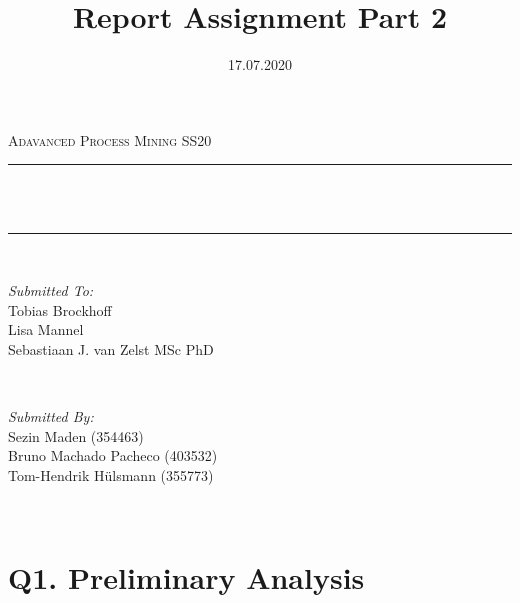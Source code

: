 \documentclass[12pt]{report}
\title{Report Assignment Part 2}
\author{}
\date{17.07.2020}
\makeatletter
\let\thetitle\@title
\makeatother
\begin{document}

\begin{titlepage}
	\centering
    \vspace*{0.5 cm}
  \begin{center}    \textsc{\Large   Adavanced Process Mining SS20}\\[2.0 cm]	\end{center}
	\rule{\linewidth}{0.2 mm} \\[0.4 cm]
	{ \huge \bfseries \thetitle}\\
	\rule{\linewidth}{0.2 mm} \\[1.5 cm]
	
  \begin{minipage}{0.48\textwidth}
    \begin{flushleft} \large
      \emph{Submitted To:}\\
      Tobias Brockhoff\\
      Lisa Mannel\\
      Sebastiaan J. van Zelst MSc PhD\\
    \end{flushleft}
  \end{minipage}~
  \begin{minipage}{0.48\textwidth}
    \begin{flushright} \large
			\emph{Submitted By:} \\
      Sezin Maden (354463) \\
      Bruno Machado Pacheco (403532)  \\
      Tom-Hendrik Hülsmann (355773)
		\end{flushright}
	\end{minipage}\\[2 cm]
	
\end{titlepage}


\renewcommand{\thesection}{\arabic{section}}

\section{Q1. Preliminary Analysis}
\end{document}

